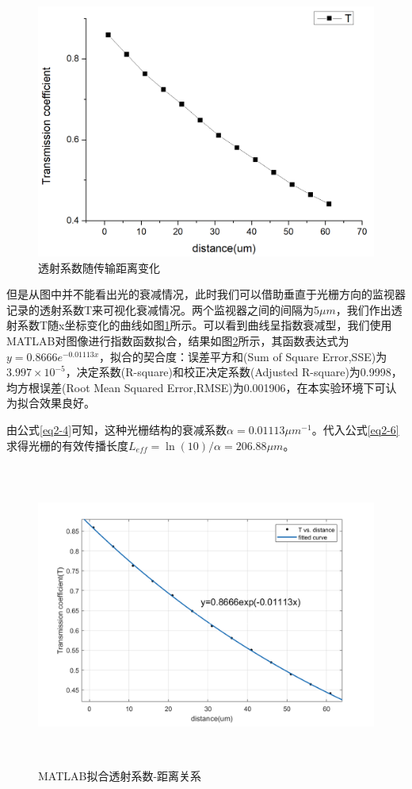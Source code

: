 \documentclass[UTF8,a4paper,12pt]{ctexart}
\numberwithin{equation}{section}
\begin{document}
\begin{figure}[htbp]
\centering
\includegraphics[width=0.8\linewidth]{fig28.png}
\caption{透射系数随传输距离变化}
\label{3-17}
\end{figure}
但是从图中并不能看出光的衰减情况，此时我们可以借助垂直于光栅方向的监视器记录的透射系数T来可视化衰减情况。两个监视器之间的间隔为5$\mu  m$，我们作出透射系数T随x坐标变化的曲线如图\ref{3-17}所示。可以看到曲线呈指数衰减型，我们使用MATLAB对图像进行指数函数拟合，结果如图\ref{3-18}所示，其函数表达式为$y=0.8666e^{-0.01113x}$，拟合的契合度：误差平方和(Sum of Square Error,SSE)为$3.997\times 10^{-5}$，决定系数(R-square)和校正决定系数(Adjusted R-square)为0.9998，均方根误差(Root Mean Squared Error,RMSE)为0.001906，在本实验环境下可认为拟合效果良好。

由公式\ref{eq2-4}可知，这种光栅结构的衰减系数$\alpha=0.01113\mu m^{-1}$。代入公式\ref{eq2-6}求得光栅的有效传播长度$L_{eff}=\ln{(10)}/\alpha = 206.88\mu m$。



\begin{figure}[htbp]
\centering
\includegraphics[height=10cm,width=15cm]{fig29.png}
\caption{MATLAB拟合透射系数-距离关系}
\label{3-18}
\end{figure}
\end{document}
